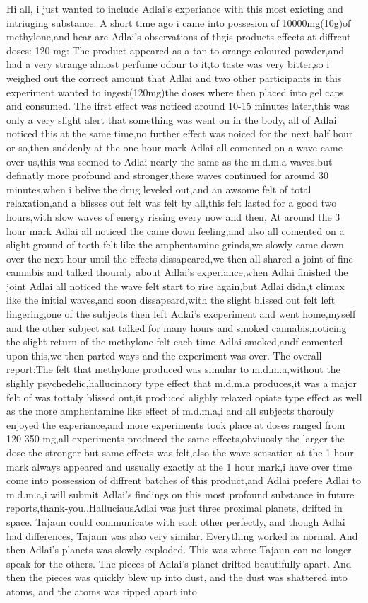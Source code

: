 \documentclass[12pt]{book}
\begin{document}
Hi all, i just wanted to include Adlai's experiance with this most exicting and intriuging substance: A short time ago i came into possesion of 10000mg(10g)of methylone,and hear are Adlai's observations of thgis products effects at diffrent doses: 120 mg: The product appeared as a tan to orange coloured powder,and had a very strange almost perfume odour to it,to taste was very bitter,so i weighed out the correct amount that Adlai and two other participants in this experiment wanted to ingest(120mg)the doses where then placed into gel caps and consumed. The ifrst effect was noticed around 10-15 minutes later,this was only a very slight alert that something was went on in the body, all of Adlai noticed this at the same time,no further effect was noiced for the next half hour or so,then suddenly at the one hour mark Adlai all comented on a wave came over us,this was seemed to Adlai nearly the same as the m.d.m.a waves,but definatly more profound and stronger,these waves continued for around 30 minutes,when i belive the drug leveled out,and an awsome felt of total relaxation,and a blisses out felt was felt by all,this felt lasted for a good two hours,with slow waves of energy rissing every now and then, At around the 3 hour mark Adlai all noticed the came down feeling,and also all comented on a slight ground of teeth felt like the amphentamine grinds,we slowly came down over the next hour until the effects dissapeared,we then all shared a joint of fine cannabis and talked thouraly about Adlai's experiance,when Adlai finished the joint Adlai all noticed the wave felt start to rise again,but Adlai didn,t climax like the initial waves,and soon dissapeard,with the slight blissed out felt left lingering,one of the subjects then left Adlai's excperiment and went home,myself and the other subject sat talked for many hours and smoked cannabis,noticing the slight return of the methylone felt each time Adlai smoked,andf comented upon this,we then parted ways and the experiment was over. The overall report:The felt that methylone produced was simular to m.d.m.a,without the slighly psychedelic,hallucinaory type effect that m.d.m.a produces,it was a major felt of was tottaly blissed out,it produced alighly relaxed opiate type effect as well as the more amphentamine like effect of m.d.m.a,i and all subjects thorouly enjoyed the experiance,and more experiments took place at doses ranged from 120-350 mg,all experiments produced the same effects,obviuosly the larger the dose the stronger but same effects was felt,also the wave sensation at the 1 hour mark always appeared and ussually exactly at the 1 hour mark,i have over time come into possession of diffrent batches of this product,and Adlai prefere Adlai to m.d.m.a,i will submit Adlai's findings on this most profound substance in future reports,thank-you..HalluciausAdlai was just three proximal planets, drifted in space. Tajaun could communicate with each other perfectly, and though Adlai had differences, Tajaun was also very similar. Everything worked as normal. And then Adlai's planets was slowly exploded. This was where Tajaun can no longer speak for the others. The pieces of Adlai's planet drifted beautifully apart. And then the pieces was quickly blew up into dust, and the dust was shattered into atoms, and the atoms was ripped apart into 
\end{document}
